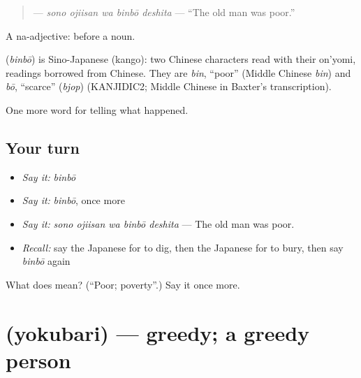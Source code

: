 \begin{quote}
\textbf{  } — \emph{sono ojiisan wa binbō deshita} — \textquotedblleft{}The old man was poor.\textquotedblright{}
\end{quote}

A na-adjective:  before a noun.

\begin{cousinweb}
\textbf{} (\emph{binbō}) is Sino-Japanese (kango): two Chinese characters read with their on'yomi, readings borrowed from Chinese. They are \emph{bin}, \textquotedblleft{}poor\textquotedblright{} (Middle Chinese \emph{bin}) and \emph{bō}, \textquotedblleft{}scarce\textquotedblright{} (\emph{bjop}) (KANJIDIC2; Middle Chinese in Baxter's transcription).
\end{cousinweb}

\begin{grammarlens}[title={What you've built}]
One more word for telling what happened.
\end{grammarlens}

\subsection*{Your turn}
\begin{itemize}
\raggedright
  \item \emph{Say it:} \emph{binbō}
  \item \emph{Say it:} \emph{binbō}, once more
  \item \emph{Say it:} \emph{sono ojiisan wa binbō deshita} — The old man was poor.
  \item \emph{Recall:} say the Japanese for to dig, then the Japanese for to bury, then say \emph{binbō} again
\end{itemize}

\begin{tcolorbox}[breakable,colback=teal!4,colframe=teal!35!black,title={Before you move on}]
What does  mean? (\textquotedblleft{}Poor; poverty\textquotedblright{}.) Say it once more.
\end{tcolorbox}
\section[\texorpdfstring{\ja{よくばり} (yokubari)}{よくばり (yokubari)}]{ (yokubari) — greedy; a greedy person}

\label{lesson:JA-C301-yokubari}




